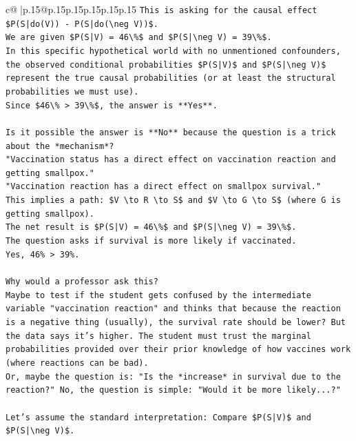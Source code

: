 \documentclass{article}
\begin{document}
{\begin{supertabular}{c@{$\;$}|p{.15\linewidth}@{}p{.15\linewidth}p{.15\linewidth}p{.15\linewidth}p{.15\linewidth}p{.15\linewidth}}
{{{\texttt{This is asking for the causal effect \$P(S|do(V)) {-} P(S|do(\textbackslash{}neg V))\$.} \\
\texttt{We are given \$P(S|V) = 46\textbackslash{}\%\$ and \$P(S|\textbackslash{}neg V) = 39\textbackslash{}\%\$.} \\
\texttt{In this specific hypothetical world with no unmentioned confounders, the observed conditional probabilities \$P(S|V)\$ and \$P(S|\textbackslash{}neg V)\$ represent the true causal probabilities (or at least the structural probabilities we must use).} \\
\texttt{Since \$46\textbackslash{}\% > 39\textbackslash{}\%\$, the answer is **Yes**.} \\
\\ 
\texttt{Is it possible the answer is **No** because the question is a trick about the *mechanism*?} \\
\texttt{"Vaccination status has a direct effect on vaccination reaction and getting smallpox."} \\
\texttt{"Vaccination reaction has a direct effect on smallpox survival."} \\
\texttt{This implies a path: \$V \textbackslash{}to R \textbackslash{}to S\$ and \$V \textbackslash{}to G \textbackslash{}to S\$ (where G is getting smallpox).} \\
\texttt{The net result is \$P(S|V) = 46\textbackslash{}\%\$ and \$P(S|\textbackslash{}neg V) = 39\textbackslash{}\%\$.} \\
\texttt{The question asks if survival is more likely if vaccinated.} \\
\texttt{Yes, 46\% > 39\%.} \\
\\ 
\texttt{Why would a professor ask this?} \\
\texttt{Maybe to test if the student gets confused by the intermediate variable "vaccination reaction" and thinks that because the reaction is a negative thing (usually), the survival rate should be lower? But the data says it's higher. The student must trust the marginal probabilities provided over their prior knowledge of how vaccines work (where reactions can be bad).} \\
\texttt{Or, maybe the question is: "Is the *increase* in survival due to the reaction?" No, the question is simple: "Would it be more likely...?"} \\
\\ 
\texttt{Let's assume the standard interpretation: Compare \$P(S|V)\$ and \$P(S|\textbackslash{}neg V)\$.} \\
}}}
\end{supertabular}}
\end{document}
